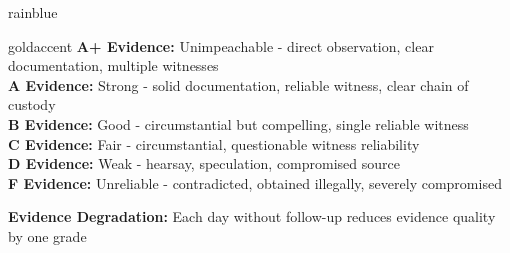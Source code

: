 \documentclass[11pt]{article}
\begin{document}
\begin{noirsection}{rainblue}
\begin{casebox}{goldaccent}
\textbf{A+ Evidence:} Unimpeachable - direct observation, clear documentation, multiple witnesses\\
\textbf{A Evidence:} Strong - solid documentation, reliable witness, clear chain of custody\\
\textbf{B Evidence:} Good - circumstantial but compelling, single reliable witness\\
\textbf{C Evidence:} Fair - circumstantial, questionable witness reliability\\
\textbf{D Evidence:} Weak - hearsay, speculation, compromised source\\
\textbf{F Evidence:} Unreliable - contradicted, obtained illegally, severely compromised

\textbf{Evidence Degradation:} Each day without follow-up reduces evidence quality by one grade
\end{casebox}
\end{noirsection}

\newpage
\end{document}
